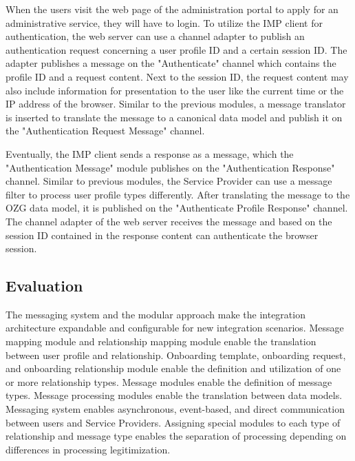 When the users visit the web page of the administration portal to apply for an administrative service, they will have to login. To utilize the IMP client for authentication, the web server can use a channel adapter to publish an authentication request concerning a user profile ID and a certain session ID. The adapter publishes a message on the "Authenticate" channel which contains the profile ID and a request content. Next to the session ID, the request content may also include information for presentation to the user like the current time or the IP address of the browser. Similar to the previous modules, a message translator is inserted to translate the message to a canonical data model and publish it on the "Authentication Request Message" channel.

Eventually, the IMP client sends a response as a message, which the "Authentication Message" module publishes on the "Authentication Response" channel. Similar to previous modules, the Service Provider can use a message filter to process user profile types differently. After translating the message to the OZG data model, it is published on the "Authenticate Profile Response" channel. The channel adapter of the web server receives the message and based on the session ID contained in the response content can authenticate the browser session.

\subsection{Evaluation}

The messaging system and the modular approach make the integration architecture expandable and configurable for new integration scenarios.
Message mapping module and relationship mapping module enable the translation between user profile and relationship.
Onboarding template, onboarding request, and onboarding relationship module enable the definition and utilization of one or more relationship types.
Message modules enable the definition of message types.
Message processing modules enable the translation between data models.
Messaging system enables asynchronous, event-based, and direct communication between users and Service Providers.
Assigning special modules to each type of relationship and message type enables the separation of processing depending on differences in processing legitimization.
